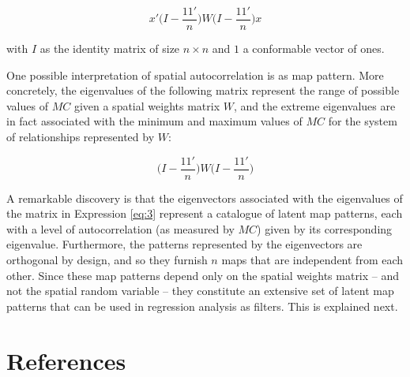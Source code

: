 \documentclass[]{elsarticle} %
\begin{document}
\begin{equation} 
\label{eq:2}
x'\Big(I - \frac{11'}{n}\Big)W\Big(I - \frac{11'}{n}\Big)x
\end{equation}

with \(I\) as the identity matrix of size \(n\times n\) and \(1\) a
conformable vector of ones.

One possible interpretation of spatial autocorrelation is as map
pattern. More concretely, the eigenvalues of the following matrix
represent the range of possible values of \(MC\) given a spatial weights
matrix \(W\), and the extreme eigenvalues are in fact associated with
the minimum and maximum values of \(MC\) for the system of relationships
represented by \(W\):

\begin{equation} 
\label{eq:3}
\Big(I - \frac{11'}{n}\Big)W\Big(I - \frac{11'}{n}\Big)
\end{equation}

A remarkable discovery is that the eigenvectors associated with the
eigenvalues of the matrix in Expression \ref{eq:3} represent a catalogue
of latent map patterns, each with a level of autocorrelation (as
measured by \(MC\)) given by its corresponding eigenvalue. Furthermore,
the patterns represented by the eigenvectors are orthogonal by design,
and so they furnish \(n\) maps that are independent from each other.
Since these map patterns depend only on the spatial weights matrix --
and not the spatial random variable -- they constitute an extensive set
of latent map patterns that can be used in regression analysis as
filters. This is explained next.

\hypertarget{references}{%
\section*{References}\label{references}}
\end{document}
